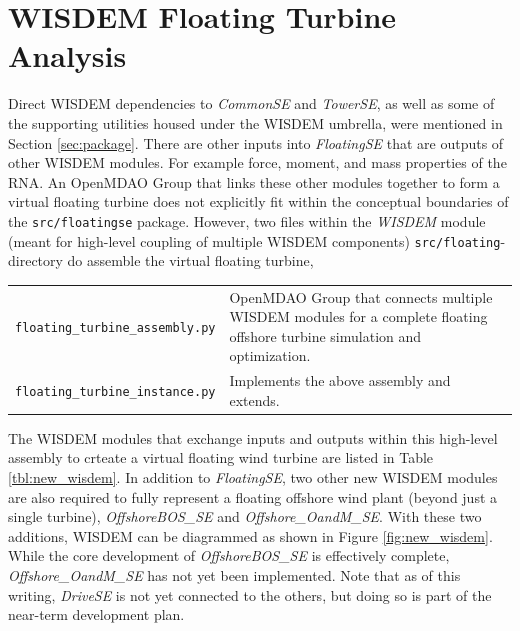 
\chapter{WISDEM Floating Turbine Analysis}
\label{sec:other}
Direct WISDEM dependencies to \textit{CommonSE} and \textit{TowerSE}, as well as some of the
supporting utilities housed under the WISDEM umbrella, were mentioned in
Section \ref{sec:package}.  There are other inputs into \textit{FloatingSE} that
are outputs of other WISDEM modules.  For example force, moment, and
mass properties of the RNA.  An OpenMDAO Group that links these other
modules together to form a virtual floating turbine does not explicitly
fit within the conceptual boundaries of the \texttt{src/floatingse} package.
However, two files within the \textit{WISDEM} module (meant for
high-level coupling of multiple WISDEM components) \texttt{src/floating}-directory
do assemble the virtual floating turbine,

{\small
\begin{tabularx}{\textwidth}{ l X }
\texttt{floating\_turbine\_assembly.py} & OpenMDAO Group that connects  multiple WISDEM modules for a complete floating offshore turbine simulation and optimization.\\
\texttt{floating\_turbine\_instance.py} & Implements the above assembly
and extends.
\end{tabularx}
}

The WISDEM modules that exchange inputs and outputs within this
high-level assembly to crteate a virtual floating wind turbine are
listed in Table \ref{tbl:new_wisdem}.  In addition to
\textit{FloatingSE}, two other new WISDEM modules are also required to
fully represent a floating offshore wind plant (beyond just a single
turbine), \textit{OffshoreBOS\_SE} and \textit{Offshore\_OandM\_SE}.
With these two additions, WISDEM can be diagrammed as shown in Figure
\ref{fig:new_wisdem}.  While the core development of
\textit{OffshoreBOS\_SE} is effectively complete,
\textit{Offshore\_OandM\_SE} has not yet been implemented. Note that as
of this writing, \textit{DriveSE} is not yet connected to the others,
but doing so is part of the near-term development plan.

